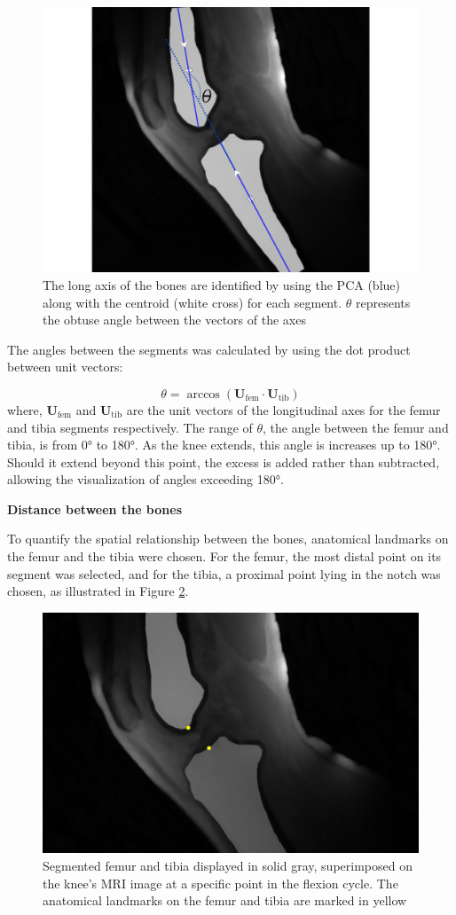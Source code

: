 \documentclass{micro-econ-thesis}
\begin{document}
\begin{figure}[H]
	\centering
	\includegraphics[width=0.7\linewidth]{theta_angle_new}
	\caption{The long axis of the bones are identified by using the PCA (blue) along with the centroid (white cross) for each segment. $\theta$ represents the obtuse angle between the vectors of the axes}
	\label{fig:longaxes}
\end{figure}

The angles between the segments was calculated by using the dot product between unit vectors:

\begin{equation}
	\theta = \arccos(\mathbf{U}_{\text{fem}} \cdot \mathbf{U}_{\text{tib}})
	\label{eq:angle}
\end{equation}
where, $\mathbf{U}_{\text{fem}}$ and $\mathbf{U}_{\text{tib}}$ are the unit vectors of the longitudinal axes for the femur and tibia segments respectively. The range of $\theta$, the angle between the femur and tibia, is from 0° to 180°. As the knee extends, this angle is increases up to 180°. Should it extend beyond this point, the excess is added rather than subtracted, allowing the visualization of angles exceeding 180°. 

\textbf{Distance between the bones}

To quantify the spatial relationship between the bones, anatomical landmarks on the femur and the tibia were chosen. For the femur, the most distal point on its segment was selected, and for the tibia, a  proximal point lying in the notch was chosen, as illustrated in Figure \ref{fig:twopoints}.   
\begin{figure}[H]
	\centering
	\includegraphics[width=0.7\linewidth]{two_points}
	\caption{Segmented femur and tibia displayed in solid gray, superimposed on the knee's MRI image at a specific point in the flexion cycle. The anatomical landmarks on the femur and tibia are marked in yellow}
	\label{fig:twopoints}
\end{figure}
\end{document}
